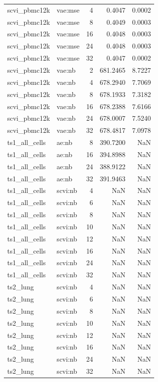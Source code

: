 \begin{tabular}{llrrr}
scvi\_pbmc12k & vae:mse & 4 & 0.4047 & 0.0002 \\
scvi\_pbmc12k & vae:mse & 8 & 0.4049 & 0.0003 \\
scvi\_pbmc12k & vae:mse & 16 & 0.4048 & 0.0003 \\
scvi\_pbmc12k & vae:mse & 24 & 0.4048 & 0.0003 \\
scvi\_pbmc12k & vae:mse & 32 & 0.4047 & 0.0002 \\
scvi\_pbmc12k & vae:nb & 2 & 681.2465 & 8.7227 \\
scvi\_pbmc12k & vae:nb & 4 & 678.2940 & 7.7069 \\
scvi\_pbmc12k & vae:nb & 8 & 678.1933 & 7.3182 \\
scvi\_pbmc12k & vae:nb & 16 & 678.2388 & 7.6166 \\
scvi\_pbmc12k & vae:nb & 24 & 678.0007 & 7.5240 \\
scvi\_pbmc12k & vae:nb & 32 & 678.4817 & 7.0978 \\
ts1\_all\_cells & ae:nb & 8 & 390.7200 & NaN \\
ts1\_all\_cells & ae:nb & 16 & 394.8988 & NaN \\
ts1\_all\_cells & ae:nb & 24 & 388.9122 & NaN \\
ts1\_all\_cells & ae:nb & 32 & 391.9463 & NaN \\
ts1\_all\_cells & scvi:nb & 4 & NaN & NaN \\
ts1\_all\_cells & scvi:nb & 6 & NaN & NaN \\
ts1\_all\_cells & scvi:nb & 8 & NaN & NaN \\
ts1\_all\_cells & scvi:nb & 10 & NaN & NaN \\
ts1\_all\_cells & scvi:nb & 12 & NaN & NaN \\
ts1\_all\_cells & scvi:nb & 16 & NaN & NaN \\
ts1\_all\_cells & scvi:nb & 24 & NaN & NaN \\
ts1\_all\_cells & scvi:nb & 32 & NaN & NaN \\
ts2\_lung & scvi:nb & 4 & NaN & NaN \\
ts2\_lung & scvi:nb & 6 & NaN & NaN \\
ts2\_lung & scvi:nb & 8 & NaN & NaN \\
ts2\_lung & scvi:nb & 10 & NaN & NaN \\
ts2\_lung & scvi:nb & 12 & NaN & NaN \\
ts2\_lung & scvi:nb & 16 & NaN & NaN \\
ts2\_lung & scvi:nb & 24 & NaN & NaN \\
ts2\_lung & scvi:nb & 32 & NaN & NaN \\
\bottomrule
\end{tabular}
